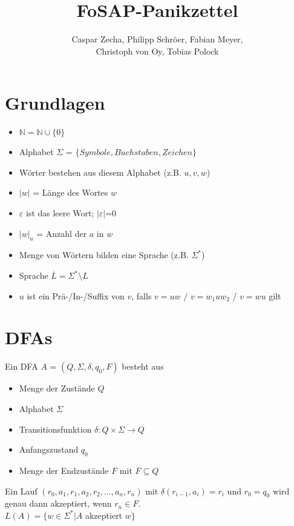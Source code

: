 \documentclass[11pt]{scrartcl}
\title{FoSAP-Panikzettel}
\author{Caspar Zecha, Philipp Schröer, Fabian Meyer, \\ Christoph von Oy, Tobias Polock}
\begin{document}
\maketitle

\setcounter{tocdepth}{2}
\tableofcontents

\section{Grundlagen}
\begin{itemize}
	\item $\mathbb{N}=\mathbb{N} \cup \{0\}$
	\item Alphabet $\Sigma$ = $\{Symbole, Buchstaben, Zeichen\}$
    \item Wörter bestehen aus diesem Alphabet (z.B. $u,v,w$)
    \item $|w|$ = Länge des Wortes $w$
    \item $\varepsilon$ ist das leere Wort; $|\varepsilon|$=0
    \item $|w|_a$ = Anzahl der $a$ in $w$
    \item Menge von Wörtern bilden eine Sprache (z.B. $\Sigma^*$)
    \item Sprache $\overline{L}=\Sigma^*\setminus L$
    \item $u$ ist ein Prä-/In-/Suffix von $v$, falls $v = uw$ / $v = w_1uw_2$ / $v = wu$ gilt
\end{itemize}

\section{DFAs}
Ein DFA $A$ = $(Q, \Sigma, \delta, q_0, F)$ besteht aus
\begin{itemize}
	\item Menge der Zustände $Q$
    \item Alphabet $\Sigma$
    \item Transitionsfunktion $\delta:Q \times \Sigma \to Q$
    \item Anfangszustand $q_0$
    \item Menge der Endzustände $F$ mit $F \subseteq Q$
\end{itemize}

Ein Lauf $(r_0, a_1, r_1, a_2, r_2, \ldots, a_n, r_n)$ mit $\delta(r_{i-1}, a_i)=r_i$ und $r_0=q_0$ wird genau dann akzeptiert, wenn $r_n \in F$. \\

$L(A)=\{w \in \Sigma^*|A$ akzeptiert $w\}$
\end{document}
